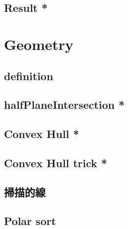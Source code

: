 \documentclass[a4paper,10pt,twocolumn,oneside]{article}
\begin{document}
\subsection{Result *}


\section{Geometry}

% 

\subsection{definition}


% 

\subsection{halfPlaneIntersection *}

% 

\subsection{Convex Hull *}


\subsection{Convex Hull trick *}


\subsection{掃描的線}


\subsection{Polar sort}

\end{document}
